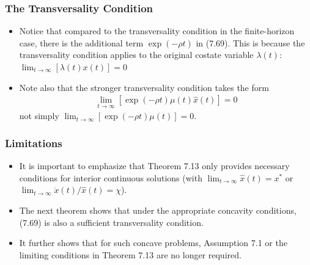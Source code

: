 \documentclass[9pt,aspectratio=169]{beamer}
\begin{document}
\begin{frame}
\frametitle{The Transversality Condition}
\begin{itemize}
    \item Notice that compared to the transversality condition in the
    finite-horizon case, there is the additional term $\exp(-\rho t)$ in
    (7.69). This is because the transversality condition applies to the
    original costate variable $\lambda(t)$:
    $\lim_{t\to\infty}[\lambda(t)x(t)] = 0$
    \item Note also that the stronger transversality condition takes the form
    \begin{align*}
        \lim_{t\to\infty}[\exp(-\rho t)\mu(t)\hat{x}(t)] = 0
    \end{align*}
    not simply $\lim_{t\to\infty}[\exp(-\rho t)\mu(t)] = 0$.
\end{itemize}
\end{frame}

\begin{frame}
\frametitle{Limitations}
\begin{itemize}
    \item It is important to emphasize that Theorem 7.13 only provides
    necessary conditions for interior continuous solutions (with
    $\lim_{t\to\infty} \hat{x}(t) = x^*$ or $\lim_{t\to\infty}
    \dot{x}(t)/\hat{x}(t) = \chi$).
    \item The next theorem shows that under the appropriate concavity
    conditions, (7.69) is also a sufficient transversality condition.
    \item It further shows that for such concave problems, Assumption 7.1 or
    the limiting conditions in Theorem 7.13 are no longer required.
\end{itemize}
\end{frame}
\end{document}
